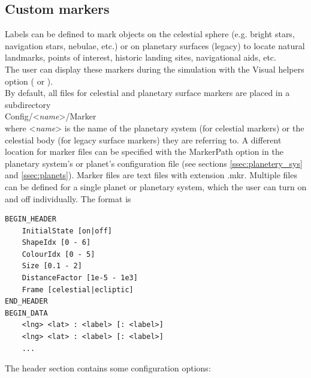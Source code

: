 \documentclass[Orbiter Developer Manual.tex]{subfiles}
\begin{document}
\subsection{Custom markers}
\label{ssec:custom_markers}

\noindent
Labels can be defined to mark objects on the celestial sphere (e.g. bright stars, navigation stars, nebulae, etc.) or on planetary surfaces (legacy) to locate natural landmarks, points of interest, historic landing sites, navigational aids, etc.\\
The user can display these markers during the simulation with the Visual helpers option ( or \Alt{}).\\
By default, all files for celestial and planetary surface markers are placed in a subdirectory\\
\indent Config/<\textit{name}>/Marker\\
where <\textit{name}> is the name of the planetary system (for celestial markers) or the celestial body (for legacy surface markers) they are referring to. A different location for marker files can be specified with the MarkerPath option in the planetary system's or planet's configuration file (see sections \ref{ssec:planetery_sys} and \ref{ssec:planets}). Marker files are text files with extension .mkr. Multiple files can be defined for a single planet or planetary system, which the user can turn on and off individually. The format is

\begin{lstlisting}[language=OSFS]
BEGIN_HEADER
	InitialState [on|off]
	ShapeIdx [0 - 6]
	ColourIdx [0 - 5]
	Size [0.1 - 2]
	DistanceFactor [1e-5 - 1e3]
	Frame [celestial|ecliptic]
END_HEADER
BEGIN_DATA
	<lng> <lat> : <label> [: <label>]
	<lng> <lat> : <label> [: <label>]
	...
\end{lstlisting}

\noindent
The header section contains some configuration options:
\end{document}
